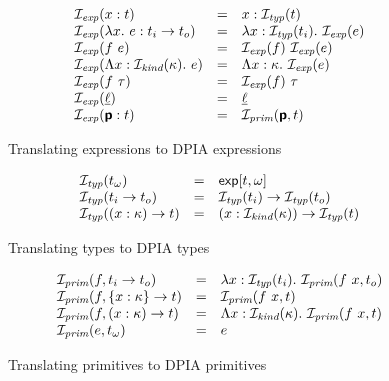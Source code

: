 \newcommand{\expToDPIA}[1]{\mathcal{I}_\textit{exp}(#1)}
\newcommand{\typToDPIA}[1]{\mathcal{I}_\textit{typ}(#1)}
\newcommand{\kindToDPIA}[1]{\mathcal{I}_\textit{kind}(#1)}
\newcommand{\primToDPIA}[2]{\mathcal{I}_\textit{prim}(#1, #2)}

\begin{figure}
  \begin{displaymath}
    \begin{array}{lcl}
      \expToDPIA{x : t} &=& x : \typToDPIA{t} \\
      \expToDPIA{\lambda x.~e : t_i \to t_o} &=& \lambda x : \typToDPIA{t_i}.~ \expToDPIA{e} \\
      \expToDPIA{f~e} &=& \expToDPIA{f}~\expToDPIA{e} \\
      \expToDPIA{\Lambda x : \kindToDPIA{\kappa}.~e} &=& \Lambda x : \kappa.~\expToDPIA{e} \\
      \expToDPIA{f~\tau} &=& \expToDPIA{f}~\tau \\
      \expToDPIA{\underline{\ell}} &=& \underline{\ell} \\
      \expToDPIA{\prim{p} : t} &=& \primToDPIA{\prim{p}}{t} \\
    \end{array}
  \end{displaymath}
  \caption{Translating \Lift{} expressions to DPIA expressions}
\end{figure}

\begin{figure}
  \begin{displaymath}
    \begin{array}{lcl}
      \typToDPIA{\tyval{t}{\W}} &=& \tyexp{t}{\W} \\
      \typToDPIA{t_i \to t_o} &=& \typToDPIA{t_i} \to \typToDPIA{t_o} \\
      \typToDPIA{(x : \kappa) \to t} &=& (x : \kindToDPIA{\kappa}) \to \typToDPIA{t} \\
    \end{array}
  \end{displaymath}
  \caption{Translating \Lift{} types to DPIA types}
\end{figure}

\begin{figure}
  \begin{displaymath}
    \begin{array}{lcl}
      \primToDPIA{f}{t_i \to t_o} &=& \lambda x : \typToDPIA{t_i}.~\primToDPIA{f~x}{t_o} \\
      \primToDPIA{f}{\{ x: \kappa \} \to t} &=& \primToDPIA{f~x}{t} \\
      \primToDPIA{f}{( x: \kappa ) \to t} &=& \Lambda x : \kindToDPIA{\kappa}.~\primToDPIA{f~x}{t} \\
      \primToDPIA{e}{\tyval{t}{\W}} &=& e \\
    \end{array}
  \end{displaymath}
  \caption{Translating \Lift{} primitives to DPIA primitives}
\end{figure}
